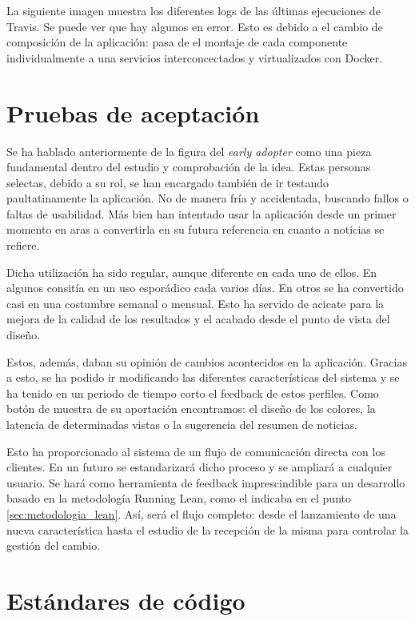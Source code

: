 La siguiente imagen muestra los diferentes logs de las últimas ejecuciones de Travis. Se puede ver que hay algunos en error. Esto es debido a el cambio de composición de la aplicación: pasa de el montaje de cada componente individualmente a una servicios interconcectados y virtualizados con Docker.

\section{Pruebas de aceptación}\label{sec:pruebas_aceptacion}

Se ha hablado anteriormente de la figura del \textit{early adopter} como una pieza fundamental dentro del estudio y comprobación de la idea. Estas personas selectas, debido a su rol, se han encargado también de ir testando paultatinamente la aplicación. No de manera fría y accidentada, buscando fallos o faltas de usabilidad. Más bien han intentado usar la aplicación desde un primer momento en aras a convertirla en su futura referencia en cuanto a noticias se refiere.

Dicha utilización ha sido regular, aunque diferente en cada uno de ellos. En algunos consitía en un uso esporádico cada varios días. En otros se ha convertido casi en una costumbre semanal o mensual. Esto ha servido de acicate para la mejora de la calidad de los resultados y el acabado desde el punto de vista del diseño.

Estos, además, daban su opinión de cambios acontecidos en la aplicación. Gracias a esto, se ha podido ir modificando las diferentes características del sistema y se ha tenido en un periodo de tiempo corto el feedback de estos perfiles. Como botón de muestra de su aportación encontramos: el diseño de los colores, la latencia de determinadas vistas o la sugerencia del resumen de noticias.

Esto ha proporcionado al sistema de un flujo de comunicación directa con los clientes. En un futuro se estandarizará dicho proceso y se ampliará a cualquier usuario. Se hará como herramienta de feedback imprescindible para un desarrollo basado en la metodología Running Lean, como el indicaba en el punto \ref{sec:metodologia_lean}. Así, será el flujo completo: desde el lanzamiento de una nueva característica hasta el estudio de la recepción de la misma para controlar la gestión del cambio.

\section{Estándares de código}\label{sec:estandares_codigo}